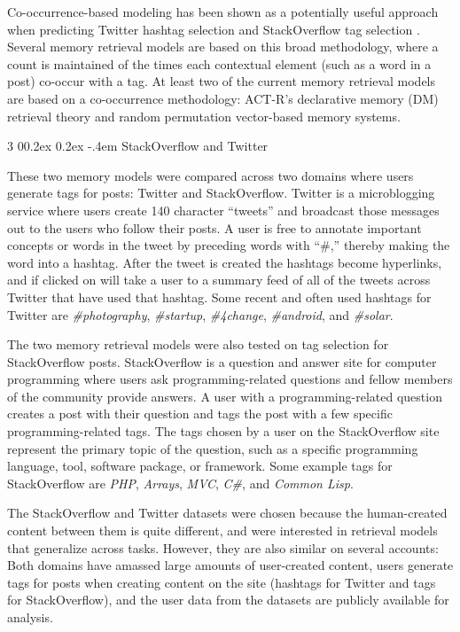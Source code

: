 \documentclass[man,floatsintext,donotrepeattitle]{apa6}
\makeatletter
\renewcommand{\subsubsection}{%
  \@startsection
  {subsubsection}%
  {3}%
  {\parindent}%
  {0\baselineskip \@plus 0.2ex \@minus 0.2ex}%
  {-.4em}%
  {\normalfont\normalsize\bfseries\addperi}}
\makeatother
\begin{document}
Co-occurrence-based modeling has been shown as a potentially useful approach when predicting Twitter hashtag selection \parencite{Efron2010} and StackOverflow tag selection \parencites{Stanley2013}.
Several memory retrieval models are based on this broad methodology, where a count is maintained of the times each contextual element (such as a word in a post) co-occur with a tag.
At least two of the current memory retrieval models are based on a co-occurrence methodology:
ACT-R's declarative memory (DM) retrieval theory and random permutation vector-based memory systems.

\subsubsection{StackOverflow and Twitter}

These two memory models were compared across two domains where users generate tags for posts: Twitter and StackOverflow.
Twitter is a microblogging service where users create 140 character ``tweets'' and broadcast those messages out to the users who follow their posts.
A user is free to annotate important concepts or words in the tweet by preceding words with ``\#,'' thereby making the word into a hashtag.
After the tweet is created the hashtags become hyperlinks, and if clicked on will take a user to a summary feed of all of the tweets across Twitter that have used that hashtag.
Some recent and often used hashtags for Twitter are \emph{\#photography}, \emph{\#startup}, \emph{\#4change}, \emph{\#android}, and \emph{\#solar}.

The two memory retrieval models were also tested on tag selection for StackOverflow posts.
StackOverflow is a question and answer site for computer programming where users ask programming-related questions and fellow members of the community provide answers.
A user with a programming-related question creates a post with their question and tags the post with a few specific programming-related tags. 
The tags chosen by a user on the StackOverflow site represent the primary topic of the question, such as a specific programming language, tool, software package, or framework.
Some example tags for StackOverflow are \emph{PHP}, \emph{Arrays}, \emph{MVC}, \emph{C\#}, and \emph{Common Lisp}.

The StackOverflow and Twitter datasets were chosen because the human-created content between them is quite different, and were interested in retrieval models that generalize across tasks.
However, they are also similar on several accounts:
Both domains have amassed large amounts of user-created content, users generate tags for posts when creating content on the site (hashtags for Twitter and tags for StackOverflow),
and the user data from the datasets are publicly available for analysis.
\end{document}
